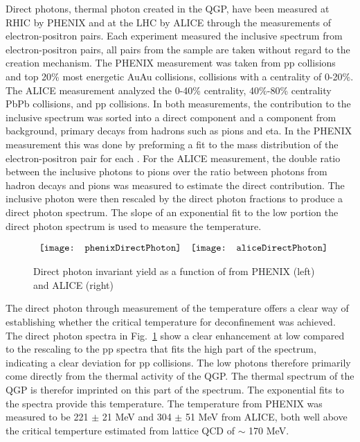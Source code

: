     Direct photons, thermal photon created in the QGP, have been measured 
      at RHIC by PHENIX \cite{phenixPhoton2010} and at the LHC by ALICE 
      \cite{photonALICE} through the measurements of electron-positron pairs.
    Each experiment measured the inclusive \pt{} spectrum from 
      electron-positron pairs, all pairs from the sample are taken without
      regard to the creation mechanism.
    The PHENIX measurement was taken from pp collisions and top 20\% most 
      energetic AuAu collisions, collisions with a centrality of 0-20\%. 
    The ALICE measurement analyzed the 0-40\% centrality, 40\%-80\% centrality
      PbPb collisions, and pp collisions. 
    In both measurements, the contribution to the inclusive spectrum was sorted 
      into a direct component and a component from background, primary decays
      from hadrons such as pions and eta. 
    In the PHENIX measurement this was done by preforming a fit to the mass 
      distribution of the electron-positron pair for each \pt{}.
    For the ALICE measurement, the double ratio between the inclusive photons 
      to pions over the ratio between photons from hadron decays and pions was
      measured to estimate the direct contribution. 
    The inclusive photon \pt{} were then rescaled by the direct photon 
      fractions to produce a direct photon spectrum.
    The slope of an exponential fit to the low \pt{} portion the direct photon 
      spectrum is used to measure the temperature.
    \begin{figure}[!Hhbt]
      \centering
      $ \begin{array}{c c}
        \texttt{[image: phenixDirectPhoton]} &
        \texttt{[image: aliceDirectPhoton]}
      \end{array} $
      \caption{Direct photon invariant yield as a function of \pt{} from 
        PHENIX \cite{phenixPhoton2010} (left) and ALICE \cite{photonALICE} 
        (right)}
      \label{fig:directPhotonPt}
    \end{figure}

    The direct photon through measurement of the temperature offers a clear 
      way of establishing whether the critical temperature for deconfinement
      was achieved. 
    The direct photon \pt{} spectra in Fig.~\ref{fig:directPhotonPt} show a 
      clear enhancement at low \pt{} compared to the rescaling to the pp 
      spectra that fits the high \pt{} part of the spectrum, indicating a 
      clear deviation for pp collisions.
    The low \pt{} photons therefore primarily come directly from the thermal 
      activity of the QGP.
    The thermal spectrum of the QGP is therefor imprinted on this part of the 
      spectrum.
    The exponential fits to the spectra provide this temperature. 
    The temperature from PHENIX was measured to be 221 $\pm$ 21 MeV and 
      304 $\pm$ 51 MeV from ALICE, both well above the critical temperture
      estimated from lattice QCD of $\sim$ 170 MeV.

